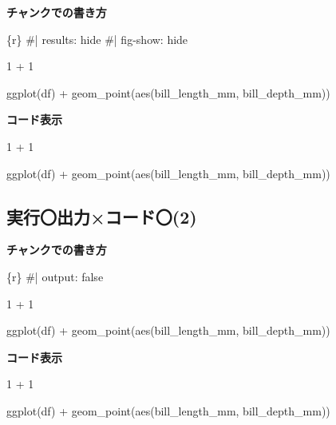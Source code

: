 \documentclass[
  b5paper,
  xelatex, ja=standard]{bxjsbook}
\newenvironment{Shaded}{\begin{snugshade}}{\end{snugshade}}
\newcommand{\DecValTok}[1]{\textcolor[rgb]{0.68,0.00,0.00}{#1}}
\newcommand{\FunctionTok}[1]{\textcolor[rgb]{0.28,0.35,0.67}{#1}}
\newcommand{\InformationTok}[1]{\textcolor[rgb]{0.37,0.37,0.37}{#1}}
\newcommand{\NormalTok}[1]{\textcolor[rgb]{0.00,0.23,0.31}{#1}}
\newcommand{\SpecialCharTok}[1]{\textcolor[rgb]{0.37,0.37,0.37}{#1}}
\begin{document}
\textbf{チャンクでの書き方}

\begin{Shaded}
\begin{Highlighting}[]
\InformationTok{\textasciigrave{}\textasciigrave{}\textasciigrave{}\{r\}}
\InformationTok{\#| results: hide}
\InformationTok{\#| fig{-}show: hide}

\InformationTok{1 + 1}


\InformationTok{ggplot(df) +}
\InformationTok{  geom\_point(aes(bill\_length\_mm, bill\_depth\_mm))}
\InformationTok{\textasciigrave{}\textasciigrave{}\textasciigrave{}}
\end{Highlighting}
\end{Shaded}

\textbf{コード表示}

\begin{Shaded}
\begin{Highlighting}[]
\DecValTok{1} \SpecialCharTok{+} \DecValTok{1}


\FunctionTok{ggplot}\NormalTok{(df) }\SpecialCharTok{+}
  \FunctionTok{geom\_point}\NormalTok{(}\FunctionTok{aes}\NormalTok{(bill\_length\_mm, bill\_depth\_mm))}
\end{Highlighting}
\end{Shaded}

\subsection{実行〇\textbar 出力×\textbar コード〇(2)}

\textbf{チャンクでの書き方}

\begin{Shaded}
\begin{Highlighting}[]
\InformationTok{\textasciigrave{}\textasciigrave{}\textasciigrave{}\{r\}}
\InformationTok{\#| output: false}

\InformationTok{1 + 1}


\InformationTok{ggplot(df) +}
\InformationTok{  geom\_point(aes(bill\_length\_mm, bill\_depth\_mm))}
\InformationTok{\textasciigrave{}\textasciigrave{}\textasciigrave{}}
\end{Highlighting}
\end{Shaded}

\textbf{コード表示}

\begin{Shaded}
\begin{Highlighting}[]
\DecValTok{1} \SpecialCharTok{+} \DecValTok{1}


\FunctionTok{ggplot}\NormalTok{(df) }\SpecialCharTok{+}
  \FunctionTok{geom\_point}\NormalTok{(}\FunctionTok{aes}\NormalTok{(bill\_length\_mm, bill\_depth\_mm))}
\end{Highlighting}
\end{Shaded}
\end{document}
